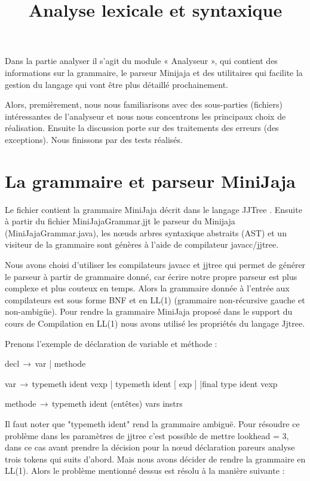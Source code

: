 \documentclass[a4paper,12pt]{article}
\title{Analyse lexicale et syntaxique}
\begin{document}
\maketitle
Dans la partie analyser il s’agit du module « Analyseur », qui contient  des informations sur la grammaire, le parseur Minijaja et des utilitaires qui facilite la  gestion du langage qui vont être plus détaillé prochainement.
 
Alors, premièrement, nous nous familiarisons avec des sous-parties (fichiers) intéressantes de l’analyseur et nous nous concentrons les principaux choix de réalisation. Ensuite la discussion porte sur des traitements des  erreurs (des exceptions). Nous finissons par des tests réalisés.

\section{La grammaire et parseur MiniJaja}
Le fichier contient la grammaire MiniJaja décrit dans le langage JJTree . Ensuite à partir du fichier MiniJajaGrammar.jjt le parseur du Minijaja (MiniJajaGrammar.java), les nœuds arbres syntaxique abstraits (AST) et un visiteur de la grammaire sont génères à l’aide de compilateur javacc/jjtree.

Nous avons choisi d’utiliser  les compilateurs javacc et jjtree qui permet de générer le parseur à partir de grammaire donné, car écrire notre propre parseur est plus complexe et plus couteux en temps. Alors la grammaire donnée à l’entrée aux compilateurs est sous forme BNF et en LL(1) (grammaire non-récursive gauche et non-ambigüe). Pour rendre la grammaire MiniJaja proposé dans le support du cours de Compilation en LL(1) nous avons utilisé les propriétés du langage Jjtree. 

Prenons l’exemple de déclaration de variable et méthode :

decl$\,\to\,$var  |  methode

var$\,\to\,$typemeth ident vexp | typemeth ident [ exp ] |final type ident vexp

methode$\,\to\,$typemeth ident (entêtes) { vars instrs }

Il faut noter que "typemeth ident" rend la grammaire ambiguë. Pour résoudre ce problème dans les paramètres de jjtree c'est possible de mettre lookhead = 3, dans ce cas  avant prendre la décision pour la nœud déclaration pareurs analyse trois tokens qui suits d’abord. Mais nous avons décider de rendre la grammaire en LL(1). Alors le problème mentionné dessus est résolu à la manière suivante : 
 
\end{document}
